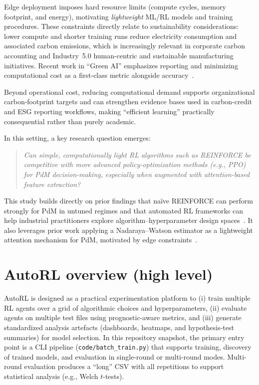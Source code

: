 \documentclass[11pt]{article}
\begin{document}
Edge deployment imposes hard resource limits (compute cycles, memory footprint, and energy), motivating \emph{lightweight} ML/RL models and training procedures. These constraints directly relate to sustainability considerations: lower compute and shorter training runs reduce electricity consumption and associated carbon emissions, which is increasingly relevant in corporate carbon accounting and Industry~5.0 human-centric and sustainable manufacturing initiatives. Recent work in ``Green AI'' emphasizes reporting and minimizing computational cost as a first-class metric alongside accuracy~\cite{Schwartz2020GreenAI, Strubell2019Energy}.

Beyond operational cost, reducing computational demand supports organizational carbon-footprint targets and can strengthen evidence bases used in carbon-credit and ESG reporting workflows, making ``efficient learning'' practically consequential rather than purely academic.

In this setting, a key research question emerges:
\begin{quote}
\emph{Can simple, computationally light RL algorithms such as \textsc{REINFORCE} be competitive with more advanced policy-optimization methods (e.g., \textsc{PPO}) for PdM decision-making, especially when augmented with attention-based feature extraction?}
\end{quote}

This study builds directly on prior findings that na\"{i}ve \textsc{REINFORCE} can perform strongly for PdM in untuned regimes and that automated RL frameworks can help industrial practitioners explore algorithm--hyperparameter design spaces~\cite{Siraskar2025NaiveREINFORCE}. It also leverages prior work applying a Nadaraya--Watson estimator as a lightweight attention mechanism for PdM, motivated by edge constraints~\cite{Siraskar2024NWAttention}.

\section{AutoRL overview (high level)}
AutoRL is designed as a practical experimentation platform to (i) train multiple RL agents over a grid of algorithmic choices and hyperparameters, (ii) evaluate agents on multiple test files using prognostic-aware metrics, and (iii) generate standardized analysis artefacts (dashboards, heatmaps, and hypothesis-test summaries) for model selection. In this repository snapshot, the primary entry point is a CLI pipeline (\texttt{code/batch\_train.py}) that supports training, discovery of trained models, and evaluation in single-round or multi-round modes. Multi-round evaluation produces a ``long'' CSV with all repetitions to support statistical analysis (e.g., Welch $t$-tests).
\end{document}
